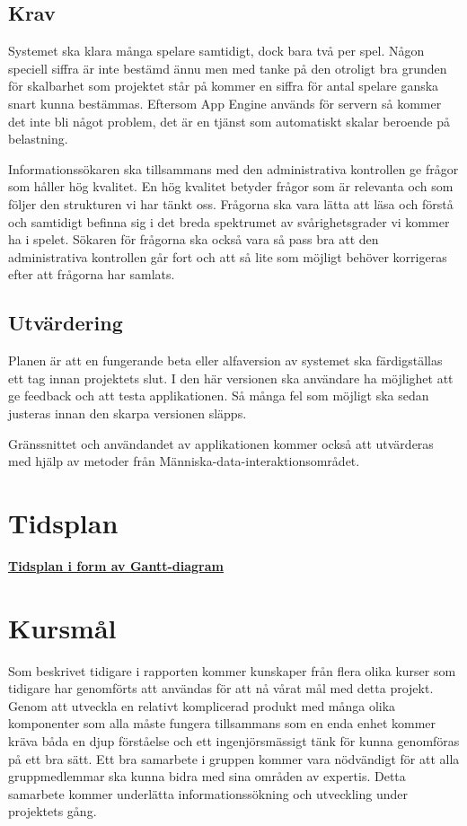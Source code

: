 \documentclass[swedish,12pt,a4paper]{article}
\begin{document}
\subsection{Krav}
Systemet ska klara många spelare samtidigt, dock bara två per spel. Någon speciell siffra är inte bestämd ännu men med tanke på den otroligt bra grunden för skalbarhet som projektet står på kommer en siffra för antal spelare ganska snart kunna bestämmas. Eftersom App Engine används för servern så kommer det inte bli något problem, det är en tjänst som automatiskt skalar beroende på belastning.

Informationssökaren ska tillsammans med den administrativa kontrollen ge frågor som håller hög kvalitet. En hög kvalitet betyder frågor som är relevanta och som följer den strukturen vi har tänkt oss. Frågorna ska vara lätta att läsa och förstå och samtidigt befinna sig i det breda spektrumet av svårighetsgrader vi kommer ha i spelet. Sökaren för frågorna ska också vara så pass bra att den administrativa kontrollen går fort och att så lite som möjligt behöver korrigeras efter att frågorna har samlats.

\subsection{Utvärdering}
Planen är att en fungerande beta eller alfaversion av systemet ska färdigställas ett tag innan projektets slut. I den här versionen ska användare ha möjlighet att ge feedback och att testa applikationen. Så många fel som möjligt ska sedan justeras innan den skarpa versionen släpps.

Gränssnittet och användandet av applikationen kommer också att utvärderas med hjälp av metoder från Människa-data-interaktionsområdet.
\appendix

\section{Tidsplan}

\textbf{\href{http://www.gantt-chart.com//?td=550c7506aa5a1dd480bd4c8d-845131}{Tidsplan i form av Gantt-diagram}}\\

\section{Kursmål}

Som beskrivet tidigare i rapporten kommer kunskaper från flera olika kurser som tidigare har genomförts att användas för att nå vårat mål med detta projekt. Genom att utveckla en relativt komplicerad produkt med många olika komponenter som alla måste fungera tillsammans som en enda enhet kommer kräva båda en djup förståelse och ett ingenjörsmässigt tänk för kunna genomföras på ett bra sätt.
Ett bra samarbete i gruppen kommer vara nödvändigt för att alla gruppmedlemmar ska kunna bidra med sina områden av expertis. Detta samarbete kommer underlätta informationssökning och utveckling under projektets gång.\\
\printbibliography
\end{document}
